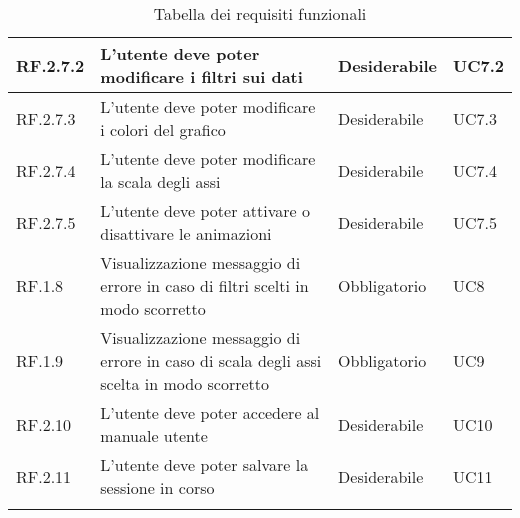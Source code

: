 \begin{center}
\begin{longtable}{|L{1,5cm}|C{5,5cm}|C{3cm}|C{2cm}|}
    RF.2.7.2 & L'utente deve poter modificare i filtri sui dati & Desiderabile & UC7.2 \\ \hline
    RF.2.7.3 & L'utente deve poter modificare i colori del grafico & Desiderabile & UC7.3 \\ \hline
    RF.2.7.4 & L'utente deve poter modificare la scala degli assi & Desiderabile & UC7.4 \\ \hline
    RF.2.7.5 & L'utente deve poter attivare o disattivare le animazioni & Desiderabile & UC7.5 \\ \hline
    RF.1.8 & Visualizzazione messaggio di errore in caso di filtri scelti in modo scorretto & Obbligatorio & UC8 \\ \hline
    RF.1.9 & Visualizzazione messaggio di errore in caso di scala degli assi scelta in modo scorretto & Obbligatorio & UC9 \\ \hline
    RF.2.10 & L'utente deve poter accedere al manuale utente & Desiderabile & UC10 \\ \hline
    RF.2.11 & L'utente deve poter salvare la sessione in corso & Desiderabile & UC11 \\ \hline

    \caption{Tabella dei requisiti funzionali}
  \end{longtable}
\end{center}

